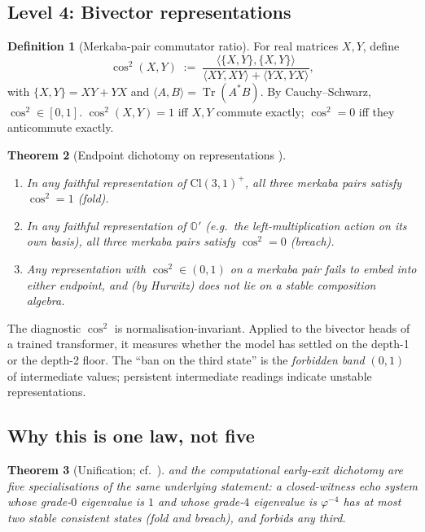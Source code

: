 \documentclass[11pt,a4paper]{article}
\theoremstyle{plain}
\newtheorem{theorem}{Theorem}[section]
\theoremstyle{definition}
\newtheorem{definition}[theorem]{Definition}
\theoremstyle{remark}
\numberwithin{equation}{section}
\providecommand{\Cl}{\mathrm{Cl}}
\providecommand{\Os}{\mathbb{O}'}
\providecommand{\vp}{\varphi}
\DeclareMathOperator{\Tr}{Tr}
\begin{document}
\subsection{Level 4: Bivector representations}

\begin{definition}[Merkaba-pair commutator ratio]
\label{def:cos2}
For real matrices $X, Y$, define
\begin{equation}
  \cos^2(X, Y) \;:=\; \frac{\langle\{X,Y\},\{X,Y\}\rangle}
                            {\langle XY, XY\rangle + \langle YX, YX\rangle},
  \label{eq:cos2}
\end{equation}
with $\{X, Y\} = XY + YX$ and $\langle A, B\rangle = \Tr(A^* B)$.
By Cauchy--Schwarz, $\cos^2 \in [0, 1]$.  $\cos^2(X, Y) = 1$ iff
$X, Y$ commute exactly; $\cos^2 = 0$ iff they anticommute exactly.
\end{definition}

\begin{theorem}[Endpoint dichotomy on representations
{\cite[Thm.~4.2]{compatibility-tower}}]
\label{thm:rep-dichotomy}
\begin{enumerate}[label=\textnormal{(\arabic*)}]
  \item In any faithful representation of $\Cl(3,1)^+$, all three
    merkaba pairs satisfy $\cos^2 = 1$ (\emph{fold}).
  \item In any faithful representation of $\Os$ (e.g.\ the
    left-multiplication action on its own basis), all three
    merkaba pairs satisfy $\cos^2 = 0$ (\emph{breach}).
  \item Any representation with $\cos^2 \in (0, 1)$ on a merkaba
    pair fails to embed into either endpoint, and (by Hurwitz)
    does not lie on a stable composition algebra.
\end{enumerate}
\end{theorem}

The diagnostic $\cos^2$ is normalisation-invariant.  Applied to
the bivector heads of a trained transformer, it measures whether
the model has settled on the depth-1 or the depth-2 floor.  The
``ban on the third state'' is the \emph{forbidden band} $(0, 1)$
of intermediate values; persistent intermediate readings indicate
unstable representations.

\subsection{Why this is one law, not five}

\begin{theorem}[Unification; cf.\ \cite{compatibility-tower}]
\label{thm:unification}
and the computational early-exit dichotomy
are five specialisations of the same underlying statement: a
closed-witness echo system whose grade-$0$ eigenvalue is $1$ and
whose grade-$4$ eigenvalue is $\vp^{-4}$ has at most two stable
consistent states (fold and breach), and forbids any third.
\end{theorem}
\end{document}
